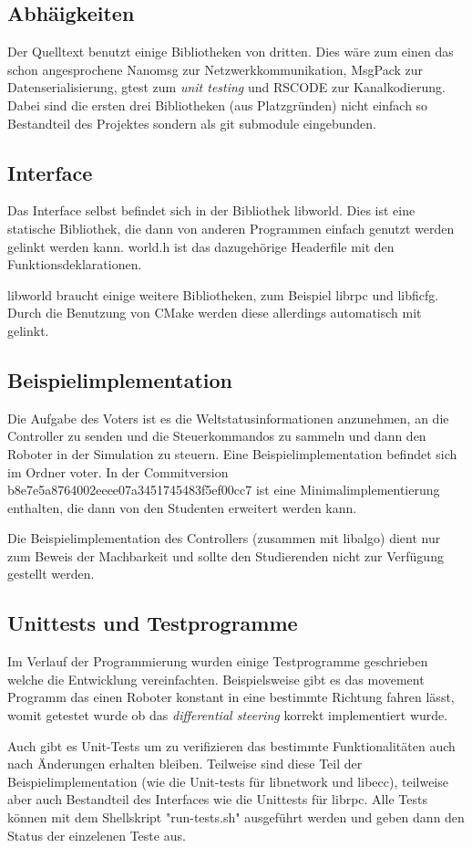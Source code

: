 \documentclass[
    12pt,
    bibliography=totoc,
    ngerman,
    enabledeprecatedfontcommands
]{scrartcl}
\begin{document}
\subsection{Abh{\"{a}}igkeiten}
Der Quelltext benutzt einige Bibliotheken von dritten. Dies w{\"{a}}re zum einen das schon angesprochene Nanomsg zur Netzwerkkommunikation, MsgPack zur Datenserialisierung,
gtest zum \textit{unit testing} und RSCODE zur Kanalkodierung. Dabei sind die ersten drei Bibliotheken (aus Platzgr{\"{u}}nden) nicht einfach so Bestandteil des Projektes
sondern als git submodule eingebunden.

\subsection{Interface}
Das Interface selbst befindet sich in der Bibliothek libworld. Dies ist eine statische Bibliothek, die dann von anderen Programmen einfach genutzt werden
gelinkt werden kann. world.h ist das dazugeh{\"{o}}rige Headerfile mit den Funktionsdeklarationen.

libworld braucht einige weitere Bibliotheken, zum Beispiel librpc und libficfg. Durch die Benutzung von CMake werden diese allerdings automatisch mit gelinkt.

\subsection{Beispielimplementation}
Die Aufgabe des Voters ist es die Weltstatusinformationen anzunehmen, an die Controller zu senden und die Steuerkommandos zu sammeln und dann den Roboter in
der Simulation zu steuern. Eine Beispielimplementation befindet sich im Ordner voter. In der Commitversion b8e7e5a8764002eeee07a3451745483f5ef00cc7 ist eine
Minimalimplementierung enthalten, die dann von den Studenten erweitert werden kann.

Die Beispielimplementation des Controllers (zusammen mit libalgo) dient nur zum Beweis der Machbarkeit und sollte den Studierenden nicht zur Verf{\"{u}}gung
gestellt werden.

\subsection{Unittests und Testprogramme}
Im Verlauf der Programmierung wurden einige Testprogramme geschrieben welche die Entwicklung vereinfachten. Beispielsweise gibt es das movement Programm das
einen Roboter konstant in eine bestimmte Richtung fahren l{\"{a}}sst, womit getestet wurde ob das \textit{differential steering} korrekt implementiert wurde.

Auch gibt es Unit-Tests um zu verifizieren das bestimmte Funktionalit{\"{a}}ten auch nach {\"{A}}nderungen erhalten bleiben. Teilweise sind diese Teil der
Beispielimplementation (wie die Unit-tests f{\"{u}}r libnetwork und libecc), teilweise aber auch Bestandteil des Interfaces wie die Unittests f{\"{u}}r librpc.
Alle Tests k{\"{o}}nnen mit dem Shellskript "run-tests.sh" ausgef{\"{u}}hrt werden und geben dann den Status der einzelenen Teste aus.
\end{document}
